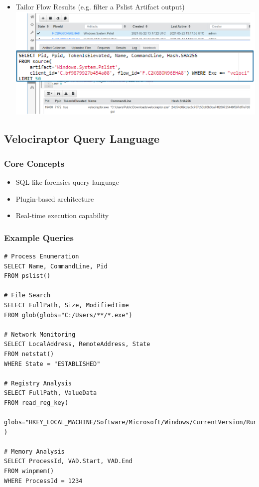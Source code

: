 \begin{itemize}
  \item Tailor Flow Results (e.g. filter a Pslist Artifact output) \\ \includegraphics[width=\textwidth]{resources/06-velociraptor-notebooks-5.png}
\end{itemize}

\subsection{Velociraptor Query Language}


\subsubsection*{Core Concepts}
\begin{itemize}
   \item SQL-like forensics query language
   \item Plugin-based architecture
   \item Real-time execution capability
\end{itemize}

\subsubsection*{Example Queries}
\begin{lstlisting}[basicstyle=\ttfamily]
# Process Enumeration
SELECT Name, CommandLine, Pid 
FROM pslist()

# File Search
SELECT FullPath, Size, ModifiedTime 
FROM glob(globs="C:/Users/**/*.exe")

# Network Monitoring
SELECT LocalAddress, RemoteAddress, State 
FROM netstat() 
WHERE State = "ESTABLISHED"

# Registry Analysis
SELECT FullPath, ValueData 
FROM read_reg_key(
   globs="HKEY_LOCAL_MACHINE/Software/Microsoft/Windows/CurrentVersion/Run/*"
)

# Memory Analysis
SELECT ProcessId, VAD.Start, VAD.End 
FROM winpmem()
WHERE ProcessId = 1234
\end{lstlisting}

